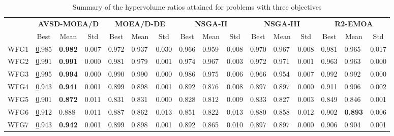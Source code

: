 \begin{table*}[t]
\caption{Summary of the hypervolume ratios attained for problems with three objectives}
\label{tab:StatisticsHV_3obj}
\centering
\begin{scriptsize}
\begin{tabular}{c l|l|l|l|l|l|l|l|l|l|l|l|l|l|l}
\cline{2-16}
 & \multicolumn{3}{c|}{\textbf{AVSD-MOEA/D}} & \multicolumn{3}{c|}{\textbf{MOEA/D-DE}} & \multicolumn{3}{c|}{\textbf{NSGA-II}} & \multicolumn{3}{c|}{\textbf{NSGA-III}} & \multicolumn{3}{c}{\textbf{R2-EMOA}} \\ \cline{2-16} 
 & \multicolumn{1}{c|}{Best} & \multicolumn{1}{c|}{Mean} & \multicolumn{1}{c|}{Std} & \multicolumn{1}{c|}{Best} & \multicolumn{1}{c|}{Mean} & \multicolumn{1}{c|}{Std} & \multicolumn{1}{c|}{Best} & \multicolumn{1}{c|}{Mean} & \multicolumn{1}{c|}{Std} & \multicolumn{1}{c|}{Best} & \multicolumn{1}{c|}{Mean} & \multicolumn{1}{c|}{Std} & \multicolumn{1}{c|}{Best} & \multicolumn{1}{c|}{Mean} & \multicolumn{1}{c}{Std} \\ \hline
\multicolumn{1}{c|}{WFG1} & {\ul 0.985} & \textbf{0.982} & 0.007 & 0.972 & 0.937 & 0.030 & 0.966 & 0.959 & 0.008 & 0.970 & 0.967 & 0.008 & 0.981 & 0.965 & 0.017 \\ \hline
\multicolumn{1}{c|}{WFG2} & {\ul 0.991} & \textbf{0.991} & 0.000 & 0.981 & 0.979 & 0.001 & 0.974 & 0.967 & 0.003 & 0.972 & 0.971 & 0.001 & 0.963 & 0.963 & 0.000 \\ \hline
\multicolumn{1}{c|}{WFG3} & {\ul 0.995} & \textbf{0.994} & 0.000 & 0.990 & 0.990 & 0.000 & 0.986 & 0.975 & 0.006 & 0.966 & 0.954 & 0.007 & 0.992 & 0.992 & 0.000 \\ \hline
\multicolumn{1}{c|}{WFG4} & {\ul 0.943} & \textbf{0.941} & 0.001 & 0.899 & 0.898 & 0.001 & 0.892 & 0.876 & 0.008 & 0.897 & 0.897 & 0.000 & 0.911 & 0.906 & 0.002 \\ \hline
\multicolumn{1}{c|}{WFG5} & {\ul 0.901} & \textbf{0.872} & 0.011 & 0.831 & 0.831 & 0.000 & 0.828 & 0.812 & 0.009 & 0.833 & 0.827 & 0.003 & 0.849 & 0.846 & 0.001 \\ \hline
\multicolumn{1}{c|}{WFG6} & {\ul 0.912} & 0.888 & 0.011 & 0.887 & 0.862 & 0.013 & 0.851 & 0.822 & 0.013 & 0.880 & 0.858 & 0.012 & 0.902 & \textbf{0.893} & 0.006 \\ \hline
\multicolumn{1}{c|}{WFG7} & {\ul 0.943} & \textbf{0.942} & 0.001 & 0.899 & 0.898 & 0.001 & 0.892 & 0.865 & 0.010 & 0.897 & 0.897 & 0.000 & 0.906 & 0.904 & 0.001 \\ \hline

\end{tabular}
\end{scriptsize}
\end{table*}
